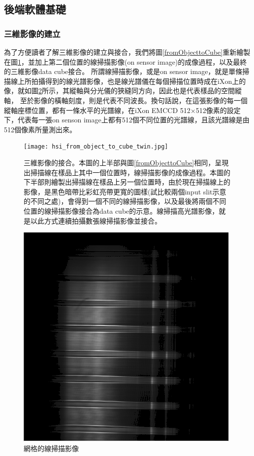 \documentclass[12pt]{article}
\begin{document}
\subsection{後端軟體基礎}
\subsubsection{三維影像的建立}

為了方便讀者了解三維影像的建立與接合，我們將圖\ref{fromObjecttoCube}重新繪製在圖\ref{fig: form data cube}，並加上第二個位置的線掃描影像(on sensor image)的成像過程，以及最終的三維影像data cube接合。
所謂線掃描影像，或是on sensor image，就是單條掃描線上所拍攝得到的線光譜影像，也是線光譜儀在每個掃描位置時成在iXon上的像，就如圖\ref{figure: linespectrum}所示，其縱軸與分光儀的狹縫同方向，因此也是代表樣品的空間縱軸，
至於影像的橫軸刻度，則是代表不同波長。換句話說，在這張影像的每一個縱軸座標位置，都有一條水平的光譜線，在iXon EMCCD 512$\times$512像素的設定下，代表每一張on senson image上都有512個不同位置的光譜線，且該光譜線是由512個像素所量測出來。

\begin{figure}
    \centering
    \texttt{[image: hsi\_from\_object\_to\_cube\_twin.jpg]}
    \caption[三維影像的接合]{三維影像的接合。本圖的上半部與圖\ref{fromObjecttoCube}相同，呈現出掃描線在樣品上其中一個位置時，線掃描影像的成像過程。本圖的下半部則繪製出掃描線在樣品上另一個位置時，由於現在掃描線上的影像，是黑色暗帶比彩虹亮帶更寬的圖樣(試比較兩個input slit示意的不同之處)，會得到一個不同的線掃描影像，以及最後將兩個不同位置的線掃描影像接合為data cube的示意。線掃描高光譜影像，就是以此方式連續拍攝數張線掃描影像並接合。}
    \label{fig: form data cube}
\end{figure}


\begin{figure}[h]
    \centering
    \includegraphics[width=0.5\linewidth]{lineSpectrum1213LDLS.png}
    \caption{網格的線掃描影像}
    \label{figure: linespectrum}
\end{figure}
\end{document}
